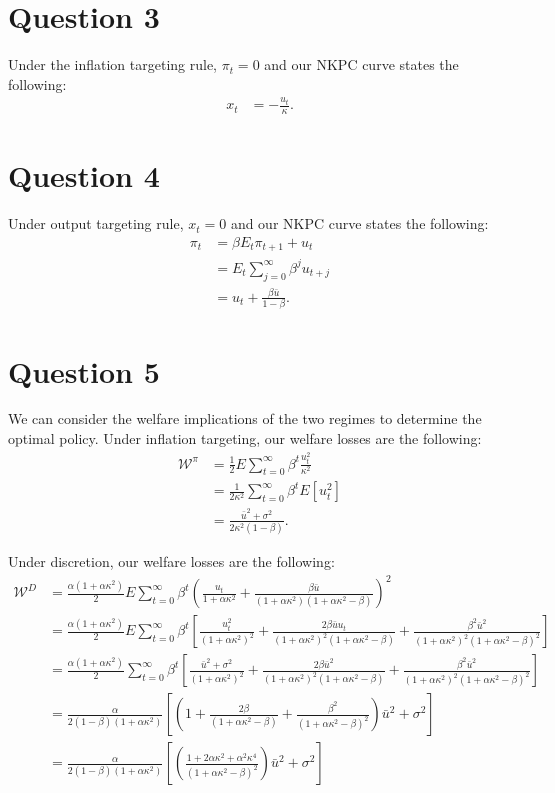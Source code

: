 \documentclass[11pt]{article} %
\begin{document}
\section{Question 3}
Under the inflation targeting rule, $\pi_t = 0$ and our NKPC curve states the following:
\begin{align*}
x_t &= -\frac{u_t}{\kappa}.
\end{align*}
\section{Question 4}
Under output targeting rule, $x_t = 0$ and our NKPC curve states the following:
\begin{align*}
\pi_t &= \beta E_t\pi_{t+1} + u_t\\
&=  E_t\sum_{j=0}^{\infty}\beta^{j}u_{t+j}\\
&= u_t + \frac{\beta\bar{u}}{1-\beta}.
\end{align*}

\section{Question 5}
We can consider the welfare implications of the two regimes to determine the optimal policy. Under inflation targeting, our welfare losses are the following:
\begin{align*}
\mathcal{W}^{\pi} &= \frac{1}{2}E\sum_{t=0}^{\infty}\beta^t \frac{u_t^2}{\kappa^2}\\
&= \frac{1}{2\kappa^2}\sum_{t=0}^{\infty}\beta^t E[u_t^2]\\
&= \frac{\bar{u}^2 + \sigma^2}{2\kappa^2(1-\beta)}.
\end{align*}

Under discretion, our welfare losses are the following:
\begin{align*}
\mathcal{W}^{D} &= \frac{\alpha(1+\alpha\kappa^2)}{2}E\sum_{t=0}^{\infty}\beta^t \left(  \frac{u_t}{1+\alpha\kappa^2} + \frac{\beta\bar{u}}{(1+\alpha\kappa^2)(1+\alpha\kappa^2 - \beta)}\right)^2\\
&=  \frac{\alpha(1+\alpha\kappa^2)}{2} E\sum_{t=0}^{\infty}\beta^t \left[ \frac{u_t^2}{(1+\alpha \kappa^2)^2} + \frac{2\beta\bar{u}u_t}{(1+\alpha\kappa^2)^2(1+\alpha\kappa^2 - \beta)} + \frac{\beta^2\bar{u}^2}{(1+\alpha\kappa^2)^2(1+\alpha\kappa^2 - \beta)^2} \right] \\
&=  \frac{\alpha(1+\alpha\kappa^2)}{2} \sum_{t=0}^{\infty}\beta^t \left[ \frac{\bar{u}^2 + \sigma^2}{(1+\alpha \kappa^2)^2} + \frac{2\beta\bar{u}^2}{(1+\alpha\kappa^2)^2(1+\alpha\kappa^2 - \beta)} + \frac{\beta^2\bar{u}^2}{(1+\alpha\kappa^2)^2(1+\alpha\kappa^2 - \beta)^2} \right] \\
&=  \frac{\alpha}{2(1-\beta)(1+\alpha\kappa^2)} \left[\left( 1 + \frac{2\beta}{(1+\alpha\kappa^2 - \beta)}  +  \frac{\beta^2}{(1+\alpha\kappa^2 - \beta)^2} \right)\bar{u}^2 + \sigma^2 \right] \\
&=  \frac{\alpha}{2(1-\beta)(1+\alpha\kappa^2)} \left[\left(   \frac{1 + 2\alpha\kappa^2 + \alpha^2\kappa^4 }{(1+\alpha\kappa^2 - \beta)^2} \right)\bar{u}^2 + \sigma^2 \right] \\
\end{align*}
\end{document}
